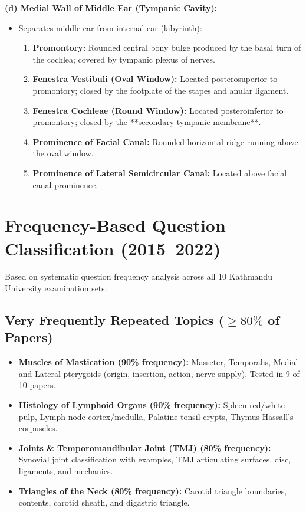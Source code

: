 \documentclass[11pt,a4paper]{article}
\begin{document}
\begin{ansbox}
\textbf{(d) Medial Wall of Middle Ear (Tympanic Cavity):}
\begin{itemize}[leftmargin=*]
    \item Separates middle ear from internal ear (labyrinth):
    \begin{enumerate}
        \item \textbf{Promontory:} Rounded central bony bulge produced by the basal turn of the cochlea; covered by tympanic plexus of nerves.
        \item \textbf{Fenestra Vestibuli (Oval Window):} Located posterosuperior to promontory; closed by the footplate of the stapes and anular ligament.
        \item \textbf{Fenestra Cochleae (Round Window):} Located posteroinferior to promontory; closed by the **secondary tympanic membrane**.
        \item \textbf{Prominence of Facial Canal:} Rounded horizontal ridge running above the oval window.
        \item \textbf{Prominence of Lateral Semicircular Canal:} Located above facial canal prominence.
    \end{enumerate}
\end{itemize}
\end{ansbox}

\newpage
\section{Frequency-Based Question Classification (2015--2022)}

Based on systematic question frequency analysis across all 10 Kathmandu University examination sets:

\subsection{Very Frequently Repeated Topics ($\ge 80\%$ of Papers)}
\begin{itemize}[leftmargin=*]
    \item \textbf{Muscles of Mastication (90\% frequency):} Masseter, Temporalis, Medial and Lateral pterygoids (origin, insertion, action, nerve supply). Tested in 9 of 10 papers.
    \item \textbf{Histology of Lymphoid Organs (90\% frequency):} Spleen red/white pulp, Lymph node cortex/medulla, Palatine tonsil crypts, Thymus Hassall's corpuscles.
    \item \textbf{Joints \& Temporomandibular Joint (TMJ) (80\% frequency):} Synovial joint classification with examples, TMJ articulating surfaces, disc, ligaments, and mechanics.
    \item \textbf{Triangles of the Neck (80\% frequency):} Carotid triangle boundaries, contents, carotid sheath, and digastric triangle.
\end{itemize}
\end{document}
